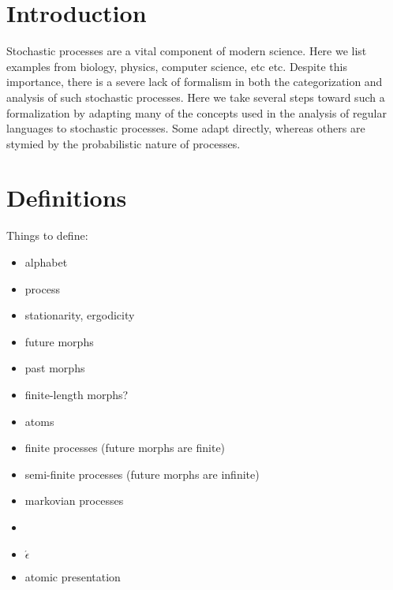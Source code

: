 \documentclass[prl,twocolumn,showpacs,superscriptaddress,preprintnumbers,floatfix]{revtex4-1}
\newcommand{\etomata}{\ensuremath{\acute{\epsilon}}\text{tomata}}
\begin{document}



\section{Introduction}
\label{sec:introduction}

Stochastic processes are a vital component of modern science. Here we list
examples from biology, physics, computer science, etc etc. Despite this
importance, there is a severe lack of formalism in both the categorization and
analysis of such stochastic processes. Here we take several steps toward such a
formalization by adapting many of the concepts used in the analysis of regular
languages to stochastic processes. Some adapt directly, whereas others are
stymied by the probabilistic nature of processes.

\section{Definitions}
\label{sec:definitions}

Things to define:
\begin{itemize}
  \item alphabet
  \item process
  \item stationarity, ergodicity
  \item future morphs
  \item past morphs
  \item finite-length morphs?
  \item atoms
  \item finite processes (future morphs are finite)
  \item semi-finite processes (future morphs are infinite)
  \item markovian processes
  \item \eM
  \item \etomata
  \item atomic presentation
\end{itemize}
\end{document}
